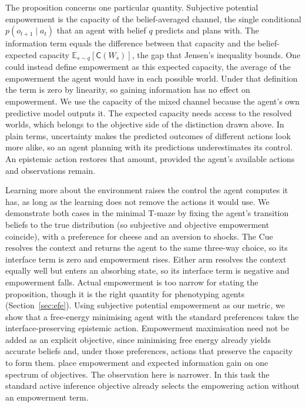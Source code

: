 \documentclass[letterpaper]{article} %
\theoremstyle{definition}
\providecommand{\E}{\mathbb{E}}
\providecommand{\Capa}{\mathsf{C}}
\begin{document}
The proposition concerns one particular quantity. Subjective potential empowerment is the capacity of the belief-averaged channel, the single conditional $p(o_{t+1} \mid a_t)$ that an agent with belief $q$ predicts and plans with. The information term equals the difference between that capacity and the belief-expected capacity $\E_{s \sim q}[\Capa(W_s)]$, the gap that Jensen's inequality bounds. One could instead define empowerment as this expected capacity, the average of the empowerment the agent would have in each possible world. Under that definition the term is zero by linearity, so gaining information has no effect on empowerment. We use the capacity of the mixed channel because the agent's own predictive model outputs it. The expected capacity needs access to the resolved worlds, which belongs to the objective side of the distinction drawn above. In plain terms, uncertainty makes the predicted outcomes of different actions look more alike, so an agent planning with its predictions underestimates its control. An epistemic action restores that amount, provided the agent's available actions and observations remain.

Learning more about the environment raises the control the agent computes it has, as long as the learning does not remove the actions it would use. We demonstrate both cases in the minimal T-maze by fixing the agent's transition beliefs to the true distribution (so subjective and objective empowerment coincide), with a preference for cheese and an aversion to shocks. The Cue resolves the context and returns the agent to the same three-way choice, so its interface term is zero and empowerment rises. Either arm resolves the context equally well but enters an absorbing state, so its interface term is negative and empowerment falls. Actual empowerment is too narrow for stating the proposition, though it is the right quantity for phenotyping agents (Section~\ref{sec:efe}). Using subjective potential empowerment as our metric, we show that a free-energy minimising agent with the standard preferences takes the interface-preserving epistemic action. Empowerment maximisation need not be added as an explicit objective, since minimising free energy already yields accurate beliefs and, under those preferences, actions that preserve the capacity to form them. \citet{hafnerActionPerceptionDivergence2020} place empowerment and expected information gain on one spectrum of objectives. The observation here is narrower. In this task the standard active inference objective already selects the empowering action without an empowerment term.
\end{document}
